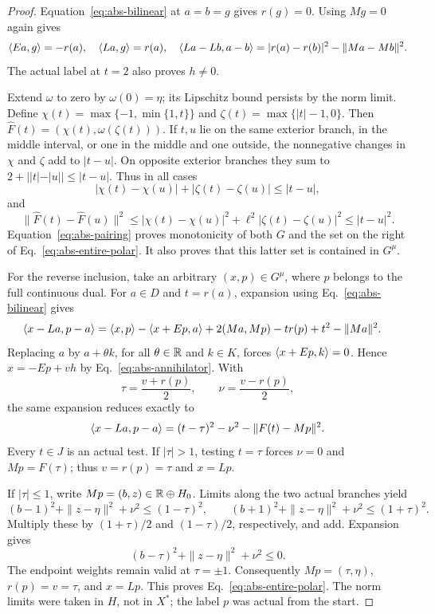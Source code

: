 \begin{proof}
Equation~\eqref{eq:abs-bilinear} at $a=b=g$ gives $r(g)=0$.
Using $Mg=0$ again gives
\begin{equation}
\langle Ea,g\rangle=-r(a),\quad \langle La,g\rangle=r(a),\quad
\langle La-Lb,a-b\rangle=|r(a)-r(b)|^2-\|Ma-Mb\|^2.
\label{eq:abs-pairing}
\end{equation}
The actual label at $t=2$ also proves $h\ne0$.

Extend $\omega$ to zero by $\omega(0)=\eta$; its Lipschitz bound
persists by the norm limit. Define
$\chi(t)=\max\{-1,\min\{1,t\}\}$ and
$\zeta(t)=\max\{|t|-1,0\}$. Then
$\widehat F(t)=(\chi(t),\omega(\zeta(t)))$.
If $t,u$ lie on the same exterior branch, in the middle interval,
or one in the middle and one outside, the nonnegative changes in
$\chi$ and $\zeta$ add to $|t-u|$. On opposite exterior branches
they sum to $2+||t|-|u||\le|t-u|$. Thus in all cases
\[
|\chi(t)-\chi(u)|+|\zeta(t)-\zeta(u)|\le|t-u|,
\]
and
\[
\|\widehat F(t)-\widehat F(u)\|^2
\le|\chi(t)-\chi(u)|^2+\ell^2|\zeta(t)-\zeta(u)|^2
\le|t-u|^2.
\]
Equation~\eqref{eq:abs-pairing} proves monotonicity of both $G$
and the set on the right of Eq.~\eqref{eq:abs-entire-polar}.
It also proves that this latter set is contained in $G^\mu$.

For the reverse inclusion, take an arbitrary $(x,p)\in G^\mu$,
where $p$ belongs to the full continuous dual. For $a\in D$ and
$t=r(a)$, expansion using Eq.~\eqref{eq:abs-bilinear} gives
\begin{align*}
\langle x-La,p-a\rangle
={}&\langle x,p\rangle-\langle x+Ep,a\rangle
       +2(Ma,Mp)-t r(p)+t^2-\|Ma\|^2.
\end{align*}
Replacing $a$ by $a+\theta k$, for all $\theta\in\mathbb R$ and
$k\in K$, forces $\langle x+Ep,k\rangle=0$. Hence
$x=-Ep+v h$ by Eq.~\eqref{eq:abs-annihilator}. With
\[
\tau=\frac{v+r(p)}2,\qquad \nu=\frac{v-r(p)}2,
\]
the same expansion reduces exactly to
\begin{equation}
\langle x-La,p-a\rangle=(t-\tau)^2-\nu^2-\|F(t)-Mp\|^2.
\label{eq:abs-polar-square}
\end{equation}
Every $t\in J$ is an actual test. If $|\tau|>1$, testing
$t=\tau$ forces $\nu=0$ and $Mp=F(\tau)$; thus
$v=r(p)=\tau$ and $x=Lp$.

If $|\tau|\le1$, write $Mp=(b,z)\in\mathbb R\oplus H_0$.
Limits along the two actual branches yield
\[
(b-1)^2+\|z-\eta\|^2+\nu^2\le(1-\tau)^2,
\qquad
(b+1)^2+\|z-\eta\|^2+\nu^2\le(1+\tau)^2.
\]
Multiply these by $(1+\tau)/2$ and $(1-\tau)/2$, respectively,
and add. Expansion gives
\[
(b-\tau)^2+\|z-\eta\|^2+\nu^2\le0.
\]
The endpoint weights remain valid at $\tau=\pm1$.
Consequently $Mp=(\tau,\eta)$, $r(p)=v=\tau$, and $x=Lp$.
This proves Eq.~\eqref{eq:abs-entire-polar}. The norm limits were
taken in $H$, not in $X^*$; the label $p$ was actual from the start.


\end{proof}
